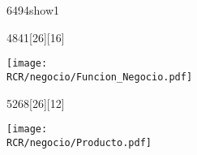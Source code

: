 \begin{NuevaPagina}{64}{94}{show1}
	
	\begin{NuevoParrafo}{48}{41}[26][16]
		\begin{Marco}[\LineaSupC][\LineaInfC][\LineaIzqC][\LineaDerC][CBlanco]
			\subseccionC{\PVFNe}%
			\centering\texttt{[image: \\RCR/negocio/Funcion\_Negocio.pdf]}
		\end{Marco}
	\end{NuevoParrafo}
	\begin{NuevoParrafo}{52}{68}[26][12]
		\begin{Marco}[\LineaSupC][\LineaInfC][\LineaIzqC][\LineaDerC][CBlanco]
			\subseccionC{\Pro}%
			\centering\texttt{[image: \\RCR/negocio/Producto.pdf]}
		\end{Marco}
	\end{NuevoParrafo}

	
	
	
	

\end{NuevaPagina}
